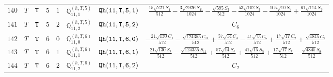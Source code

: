 \documentclass[fleqn,8pt]{jsarticle}
\begin{document}
\begin{table}[ht!]
\begin{center}
\begin{tabular}{cccccccc}
$ 140 $ & $ T $ & $ {\tt T} $ & $ 5 $ & $ 1 $ & $ \mathbb{Q}_{11,1}^{(h,T,5)} $ & $ {\tt Qh(11,T,5,1)} $ & $ \frac{15 \sqrt{221} S_{1}}{512} - \frac{3 \sqrt{2926} S_{11}}{1024} - \frac{\sqrt{595} S_{3}}{512} - \frac{53 \sqrt{102} S_{5}}{1024} - \frac{105 \sqrt{10} S_{7}}{1024} + \frac{61 \sqrt{114} S_{9}}{1024} $ \\
$ 141 $ & $ T $ & $ {\tt T} $ & $ 5 $ & $ 2 $ & $ \mathbb{Q}_{11,2}^{(h,T,5)} $ & $ {\tt Qh(11,T,5,2)} $ & $ C_{6} $ \\
$ 142 $ & $ T $ & $ {\tt T} $ & $ 6 $ & $ 0 $ & $ \mathbb{Q}_{11,0}^{(h,T,6)} $ & $ {\tt Qh(11,T,6,0)} $ & $ - \frac{21 \sqrt{130} C_{1}}{512} - \frac{\sqrt{124355} C_{11}}{512} + \frac{57 \sqrt{14} C_{3}}{512} - \frac{41 \sqrt{15} C_{5}}{512} + \frac{17 \sqrt{17} C_{7}}{512} + \frac{\sqrt{4845} C_{9}}{512} $ \\
$ 143 $ & $ T $ & $ {\tt T} $ & $ 6 $ & $ 1 $ & $ \mathbb{Q}_{11,1}^{(h,T,6)} $ & $ {\tt Qh(11,T,6,1)} $ & $ \frac{21 \sqrt{130} S_{1}}{512} - \frac{\sqrt{124355} S_{11}}{512} + \frac{57 \sqrt{14} S_{3}}{512} + \frac{41 \sqrt{15} S_{5}}{512} + \frac{17 \sqrt{17} S_{7}}{512} - \frac{\sqrt{4845} S_{9}}{512} $ \\
$ 144 $ & $ T $ & $ {\tt T} $ & $ 6 $ & $ 2 $ & $ \mathbb{Q}_{11,2}^{(h,T,6)} $ & $ {\tt Qh(11,T,6,2)} $ & $ C_{2} $ \\
 \hline \hline
\end{tabular}
\end{center}
\end{table}
\end{document}
